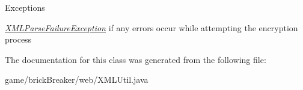 \begin{DoxyExceptions}{Exceptions}
\item[{\em \hyperlink{classbrick_breaker_1_1web_1_1_x_m_l_parse_failure_exception}{XMLParseFailureException}}]if any errors occur while attempting the encryption process \end{DoxyExceptions}


The documentation for this class was generated from the following file:\begin{DoxyCompactItemize}
\item 
game/brickBreaker/web/XMLUtil.java\end{DoxyCompactItemize}
